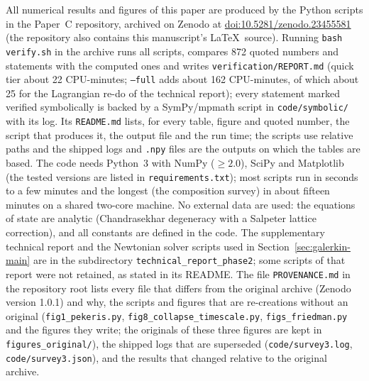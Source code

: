\documentclass[11pt]{article}
\begin{document}
All numerical results and figures of this paper are produced by the Python scripts in the Paper~C repository, archived on Zenodo at \href{https://doi.org/10.5281/zenodo.23455581}{doi:10.5281/zenodo.23455581} (the repository also contains this manuscript's \LaTeX\ source). Running \texttt{bash verify.sh} in the archive runs all scripts, compares 872 quoted numbers and statements with the computed ones and writes \texttt{verification/REPORT.md} (quick tier about 22 CPU-minutes; \texttt{--full} adds about 162 CPU-minutes, of which about 25 for the Lagrangian re-do of the technical report); every statement marked verified symbolically is backed by a SymPy/mpmath script in \texttt{code/symbolic/} with its log. Its \texttt{README.md} lists, for every table, figure and quoted number, the script that produces it, the output file and the run time; the scripts use relative paths and the shipped logs and \texttt{.npy} files are the outputs on which the tables are based. The code needs Python~3 with NumPy ($\geq2.0$), SciPy and Matplotlib (the tested versions are listed in \texttt{requirements.txt}); most scripts run in seconds to a few minutes and the longest (the composition survey) in about fifteen minutes on a shared two-core machine. No external data are used: the equations of state are analytic (Chandrasekhar degeneracy with a Salpeter lattice correction), and all constants are defined in the code. The supplementary technical report \citep{OwnbyPhase2} and the Newtonian solver scripts used in Section~\ref{sec:galerkin-main} are in the subdirectory \texttt{technical\_report\_phase2}; some scripts of that report were not retained, as stated in its README. The file \texttt{PROVENANCE.md} in the repository root lists every file that differs from the original archive (Zenodo version 1.0.1) and why, the scripts and figures that are re-creations without an original (\texttt{fig1\_pekeris.py}, \texttt{fig8\_collapse\_timescale.py}, \texttt{figs\_friedman.py} and the figures they write; the originals of these three figures are kept in \texttt{figures\_original/}), the shipped logs that are superseded (\texttt{code/survey3.log}, \texttt{code/survey3.json}), and the results that changed relative to the original archive.



\end{document}
